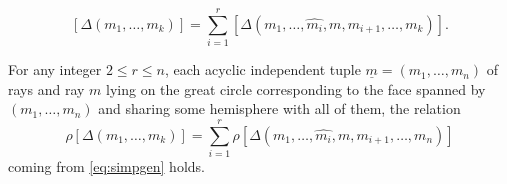\documentclass[10pt,a4paper]{amsart}
\begin{document}
        \begin{equation}\label{eq:simpgen}
        [\Delta(m_1,\ldots, m_k)]=\sum_{i=1}^r [\Delta(m_1,\ldots, \hat{m_i},m,m_{i+1},\ldots, m_k)].
        \end{equation}

    \begin{prop} \label{prop:gersrel}
    For any integer $2\le r \le n$, each acyclic independent tuple $\underline{m}=(m_1,\ldots, m_n)$ of rays and ray $m$ lying on the great circle corresponding to the face spanned by $(m_1,\ldots, m_n)$ and sharing some hemisphere with all of them, the relation
        \begin{equation}
        \rho[\Delta(m_1,\ldots, m_k)]=\sum_{i=1}^r \rho[\Delta(m_1,\ldots, \hat{m_i},m,m_{i+1},\ldots, m_n)]
        \end{equation}
    coming from \eqref{eq:simpgen} holds. 
    \end{prop}
\end{document}
